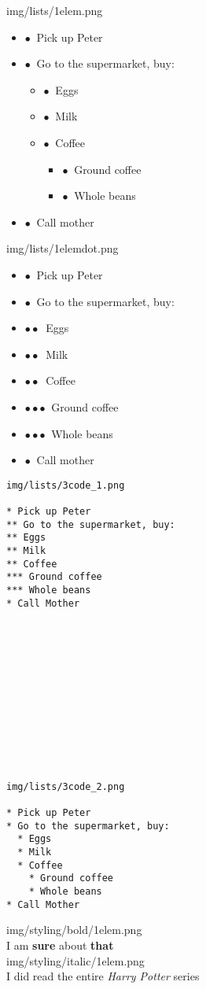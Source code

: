 \documentclass[12pt]{article}
\begin{document}
img/lists/1elem.png
\begin{itemize}
\setlength{\itemsep}{0pt}
\setlength{\parskip}{0pt}
\setlength{\parsep}{0pt}
\item $\bullet\ $ Pick up Peter
\item $\bullet\ $ Go to the supermarket, buy:
\begin{itemize}
\setlength{\itemsep}{0pt}
\setlength{\parskip}{0pt}
\setlength{\parsep}{0pt}
\item $\bullet\ $ Eggs
\item $\bullet\ $ Milk
\item $\bullet\ $ Coffee
\begin{itemize}
\setlength{\itemsep}{0pt}
\setlength{\parskip}{0pt}
\setlength{\parsep}{0pt}
\item $\bullet\ $ Ground coffee
\item $\bullet\ $ Whole beans
\end{itemize}
\end{itemize}
\item $\bullet\ $ Call mother
\end{itemize}
\noindent
img/lists/1elemdot.png
\begin{itemize}
\setlength{\itemsep}{1pt}
\setlength{\parskip}{0pt}
\setlength{\parsep}{0pt}
\item $\bullet\ $ Pick up Peter
\item $\bullet\ $ Go to the supermarket, buy:
\item $\bullet\bullet\ $ Eggs
\item $\bullet\bullet\ $ Milk
\item $\bullet\bullet\ $ Coffee
\item $\bullet\bullet$$\bullet\ $ Ground coffee
\item $\bullet\bullet$$\bullet\ $ Whole beans
\item $\bullet\ $ Call mother
\end{itemize}
\noindent

\begin{verbatim}
img/lists/3code_1.png

* Pick up Peter
** Go to the supermarket, buy:
** Eggs
** Milk
** Coffee
*** Ground coffee
*** Whole beans
* Call Mother













img/lists/3code_2.png

* Pick up Peter
* Go to the supermarket, buy:
  * Eggs
  * Milk
  * Coffee
    * Ground coffee
    * Whole beans
* Call Mother

\end{verbatim}
\noindent
img/styling/bold/1elem.png\\[.25cm]
I am \textbf{sure} about \textbf{that}\\[.5cm]
img/styling/italic/1elem.png\\[.25cm]
I did read the entire \textit{Harry Potter} series\\[.25cm]
\end{document}
